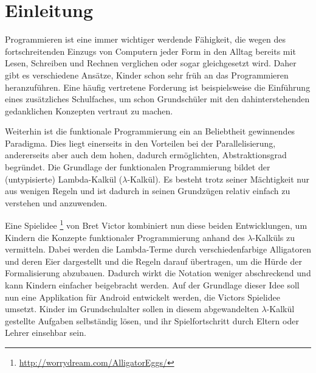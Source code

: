 \section{Einleitung}

Programmieren ist eine immer wichtiger werdende Fähigkeit, die wegen des fortschreitenden Einzugs von Computern jeder Form in den Alltag bereits mit Lesen, Schreiben und Rechnen verglichen oder sogar gleichgesetzt wird.
Daher gibt es verschiedene Ansätze, Kinder schon sehr früh an das Programmieren heranzuführen.
Eine häufig vertretene Forderung ist beispielsweise die Einführung eines zusätzliches Schulfaches, um schon Grundschüler mit den dahinterstehenden gedanklichen Konzepten vertraut zu machen.

Weiterhin ist die funktionale Programmierung ein an Beliebtheit gewinnendes Paradigma.
Dies liegt einerseits in den Vorteilen bei der Parallelisierung, andererseits aber auch dem hohen, dadurch ermöglichten, Abstraktionsgrad begründet.
Die Grundlage der funktionalen Programmierung bildet der (untypisierte) Lambda-Kalkül (\(\lambda\)-Kalkül).
Es besteht trotz seiner Mächtigkeit nur aus wenigen Regeln und ist dadurch in seinen Grundzügen relativ einfach zu verstehen und anzuwenden.

Eine Spielidee \footnote{\url{http://worrydream.com/AlligatorEggs/}} von Bret Victor kombiniert nun diese beiden Entwicklungen, um Kindern die Konzepte funktionaler Programmierung anhand des \(\lambda\)-Kalküls zu vermitteln.
Dabei werden die Lambda-Terme durch verschiedenfarbige Alligatoren und deren Eier dargestellt und die Regeln darauf übertragen, um die Hürde der Formalisierung abzubauen.
Dadurch wirkt die Notation weniger abschreckend und kann Kindern einfacher beigebracht werden.
Auf der Grundlage dieser Idee soll nun eine Applikation für Android entwickelt werden, die Victors Spielidee umsetzt.
Kinder im Grundschulalter sollen in diesem abgewandelten \(\lambda\)-Kalkül gestellte Aufgaben selbständig lösen, und ihr Spielfortschritt durch Eltern oder Lehrer einsehbar sein.
